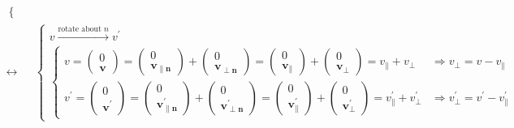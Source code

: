 \documentclass[
]{book}
\theoremstyle{definition}
\theoremstyle{definition}
\theoremstyle{definition}
\theoremstyle{definition}
\theoremstyle{remark}
\begin{document}
\[\begin{aligned}
\begin{cases}
\end{cases}\\
\leftrightarrow & \begin{cases}
v\xrightarrow{\text{rotate about }n}v^{\prime}\\
\begin{cases}
v=\begin{pmatrix}0\\
\boldsymbol{v}
\end{pmatrix}=\begin{pmatrix}0\\
\boldsymbol{v}_{{\scriptscriptstyle \parallel\boldsymbol{n}}}
\end{pmatrix}+\begin{pmatrix}0\\
\boldsymbol{v}_{{\scriptscriptstyle \perp\boldsymbol{n}}}
\end{pmatrix}=\begin{pmatrix}0\\
\boldsymbol{v}_{{\scriptscriptstyle \parallel}}
\end{pmatrix}+\begin{pmatrix}0\\
\boldsymbol{v}_{{\scriptscriptstyle \perp}}
\end{pmatrix}=v_{{\scriptscriptstyle \parallel}}+v_{{\scriptscriptstyle \perp}} & \Rightarrow v_{{\scriptscriptstyle \perp}}=v-v_{{\scriptscriptstyle \parallel}}\\
v^{\prime}=\begin{pmatrix}0\\
\boldsymbol{v}^{\prime}
\end{pmatrix}=\begin{pmatrix}0\\
\boldsymbol{v}^{\prime}_{{\scriptscriptstyle \parallel\boldsymbol{n}}}
\end{pmatrix}+\begin{pmatrix}0\\
\boldsymbol{v}^{\prime}_{{\scriptscriptstyle \perp\boldsymbol{n}}}
\end{pmatrix}=\begin{pmatrix}0\\
\boldsymbol{v}^{\prime}_{{\scriptscriptstyle \parallel}}
\end{pmatrix}+\begin{pmatrix}0\\
\boldsymbol{v}^{\prime}_{{\scriptscriptstyle \perp}}
\end{pmatrix}=v_{{\scriptscriptstyle \parallel}}^{\prime}+v_{{\scriptscriptstyle \perp}}^{\prime} & \Rightarrow v_{{\scriptscriptstyle \perp}}^{\prime}=v^{\prime}-v_{{\scriptscriptstyle \parallel}}^{\prime}

\end{cases}
\end{cases}
\end{aligned}\]
\end{document}
